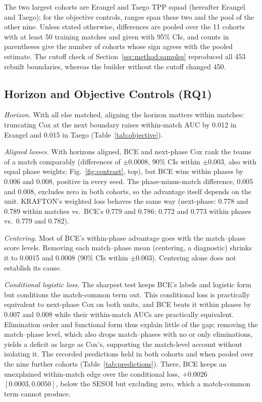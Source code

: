 \documentclass[sigconf,anonymous]{acmart}
\begin{document}
The two largest cohorts are Erangel and Taego TPP squad (hereafter Erangel and Taego); for the objective controls, ranges span these two and the pool of the other nine. Unless stated otherwise, differences are pooled over the 11 cohorts with at least 50 training matches and given with 95\% CIs, and counts in parentheses give the number of cohorts whose sign agrees with the pooled estimate. The cutoff check of Section~\ref{sec:method:samples} reproduced all 453 rebuilt boundaries, whereas the builder without the cutoff changed 450.

\subsection{Horizon and Objective Controls (RQ1)}
\label{sec:results:rq1}
\emph{Horizon.} With all else matched, aligning the horizon matters within matches: truncating Cox at the next boundary raises within-match AUC by 0.012 in Erangel and 0.015 in Taego (Table~\ref{tab:objective}).

\emph{Aligned losses.} With horizons aligned, BCE and next-phase Cox rank the teams of a match comparably (differences of $\pm0.0008$, 90\% CIs within $\pm0.003$, also with equal phase weights; Fig.~\ref{fig:contrast}, top), but BCE wins within phases by 0.006 and 0.008, positive in every seed. The phase-minus-match difference, 0.005 and 0.008, excludes zero in both cohorts, so the advantage itself depends on the unit. KRAFTON's weighted loss behaves the same way (next-phase: 0.778 and 0.789 within matches vs.\ BCE's 0.779 and 0.786; 0.772 and 0.773 within phases vs.\ 0.779 and 0.782).

\emph{Centering.} Most of BCE's within-phase advantage goes with the match--phase score levels. Removing each match--phase mean (centering, a diagnostic) shrinks it to 0.0015 and 0.0008 (90\% CIs within $\pm0.003$). Centering alone does not establish its cause.

\emph{Conditional logistic loss.} The sharpest test keeps BCE's labels and logistic form but conditions the match-common term out. This conditional loss is practically equivalent to next-phase Cox on both units, and BCE beats it within phases by 0.007 and 0.008 while their within-match AUCs are practically equivalent. Elimination order and functional form thus explain little of the gap; removing the match--phase level, which also drops match--phases with no or only eliminations, yields a deficit as large as Cox's, supporting the match-level account without isolating it. The recorded predictions held in both cohorts and when pooled over the nine further cohorts (Table~\ref{tab:predictions}). There, BCE keeps an unexplained within-match edge over the conditional loss, $+0.0026$ $[0.0003,\allowbreak 0.0050]$, below the SESOI but excluding zero, which a match-common term cannot produce.
\end{document}
